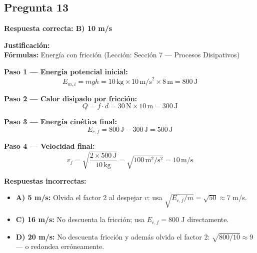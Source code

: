 \begin{respuestabox}
\subsection{Pregunta 13}
\textcolor{verdecorrecto}{\textbf{Respuesta correcta: B) 10 m/s}}

\textbf{Justificación:}\\
\textbf{Fórmulas:} Energía con fricción (Lección: Sección 7 --- Procesos Disipativos)

\textbf{Paso 1 --- Energía potencial inicial:}
$$E_{m,i} = mgh = 10\,\text{kg} \times 10\,\text{m/s}^2 \times 8\,\text{m} = 800\,\text{J}$$

\textbf{Paso 2 --- Calor disipado por fricción:}
$$Q = f \cdot d = 30\,\text{N} \times 10\,\text{m} = 300\,\text{J}$$

\textbf{Paso 3 --- Energía cinética final:}
$$E_{c,f} = 800\,\text{J} - 300\,\text{J} = 500\,\text{J}$$

\textbf{Paso 4 --- Velocidad final:}
$$v_f = \sqrt{\frac{2 \times 500\,\text{J}}{10\,\text{kg}}} = \sqrt{100\,\text{m}^2/\text{s}^2} = 10\,\text{m/s}$$

\textbf{Respuestas incorrectas:}
\begin{itemize}
    \item \textbf{A) 5 m/s:} Olvida el factor 2 al despejar $v$: usa $\sqrt{E_{c,f}/m} = \sqrt{50} \approx 7$ m/s.
    \item \textbf{C) 16 m/s:} No descuenta la fricción; usa $E_{c,f} = 800$ J directamente.
    \item \textbf{D) 20 m/s:} No descuenta fricción y además olvida el factor 2: $\sqrt{800/10} \approx 9$ --- o redondea erróneamente.
\end{itemize}
\end{respuestabox}

